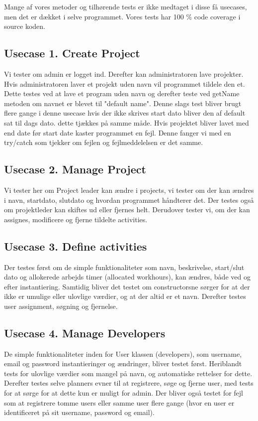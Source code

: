 \documentclass[a4paper,12pt]{article}
\begin{document}
Mange af vores metoder og tilhørende tests er ikke medtaget i disse få usecases, men det er dækket i selve programmet. Vores tests har 100 \% code coverage i source koden.
\subsection*{Usecase 1. Create Project}
Vi tester om admin er logget ind. Derefter kan administratoren lave projekter. Hvis administratoren laver et projekt uden navn vil programmet tildele den et. Dette testes ved at lave et program uden navn og derefter teste ved getName metoden om navnet er blevet til "default name". Denne slags test bliver brugt flere gange i denne usecase hvis der ikke skrives start dato bliver den af default sat til dags dato. dette tjækkes på samme måde. Hvis projektet bliver lavet med end date før start date kaster programmet en fejl. Denne fanger vi med en try/catch som tjekker om fejlen og fejlmeddelelsen er det samme.

\subsection*{Usecase 2. Manage Project}
Vi tester her om Project leader kan ændre i projects, vi tester om der kan ændres i navn, startdato, slutdato og hvordan programmet håndterer det. Der testes også om projektleder kan skiftes ud eller fjernes helt. Derudover tester vi, om der kan assignes, modificere og fjerne tildelte activities.

\subsection*{Usecase 3. Define activities}
Der testes først om de simple funktionaliteter som navn, beskrivelse, start/slut dato og allokerede arbejds timer (allocated workhours), kan ændres, både ved og efter instantiering. Samtidig bliver det testet om constructorsne sørger for at der ikke er umulige eller ulovlige værdier, og at der altid er et navn. Derefter testes user assignment, søgning og fjernelse.

\subsection*{Usecase 4. Manage Developers}
De simple funktionaliteter inden for User klassen (developers), som username, email og password instantieringer og ændringer, bliver testet først. Heriblandt tests for ulovlige værdier som mangel på navn, og automatiske rettelser for dette. Derefter testes selve planners evner til at registrere, søge og fjerne user, med tests for at sørge for at dette kun er muligt for admin. Der bliver også testet for fejl som at registrere tomme users eller samme user flere gange (hvor en user er identificeret på sit username, password og email).
\end{document}

